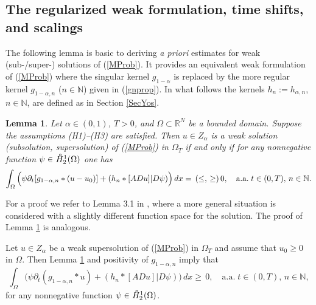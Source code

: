 \documentclass[10pt]{article}
\newtheorem{lemma}{Lemma}[section]
\newcommand{\iR}{\mathbb{R}}
\newcommand{\iN}{\mathbb{N}}
\newcommand{\oH}{\hspace*{0.39em}\raisebox{0.6ex}{\textdegree}\hspace{-0.72em}H}
\begin{document}
\subsection{The regularized weak formulation, time shifts, and
scalings}\label{SSS}
The following lemma is basic to deriving {\em a priori} estimates
for weak (sub-/super-) solutions of (\ref{MProb}). It provides an
equivalent weak formulation of (\ref{MProb}) where the singular
kernel $g_{1-\alpha}$ is replaced by the more regular kernel
$g_{1-\alpha,n}$ ($n\in\iN$) given in (\ref{gnprop}). In what
follows the kernels $h_n:=h_{\alpha,n}$, $n\in\iN$, are defined as
in Section \ref{SecYos}.
\begin{lemma} \label{LemmaReg}
Let $\alpha\in (0,1)$, $T>0$, and $\Omega\subset \iR^N$ be a bounded
domain. Suppose the assumptions (H1)--(H3) are satisfied. Then $u\in
Z_\alpha$ is a weak solution (subsolution, supersolution) of
(\ref{MProb}) in $\Omega_T$ if and only if for any nonnegative
function $\psi\in \oH^1_2(\Omega)$ one has
\begin{equation} \label{LemmaRegF}
\int_\Omega \Big(\psi \partial_t[g_{1-\alpha,n}\ast
(u-u_0)]+(h_n\ast [ADu]|D\psi)\Big)\,dx\nonumber\\
=\,(\le,\,\ge)\,0,\quad\mbox{a.a.}\;t\in (0,T),\,n\in \iN.
\end{equation}
\end{lemma}
For a proof we refer to Lemma 3.1 in \cite{Za2}, where a more
general situation is considered with a slightly different function
space for the solution. The proof of Lemma \ref{LemmaReg} is
analogous.

Let $u\in Z_\alpha$ be a weak supersolution of (\ref{MProb}) in
$\Omega_T$ and assume that $u_0\ge 0$ in $\Omega$. Then Lemma
\ref{LemmaReg} and positivity of $g_{1-\alpha,n}$ imply that
\begin{equation} \label{u0weg}
\int_\Omega \Big(\psi \partial_t(g_{1-\alpha,n}\ast u)+(h_n\ast
[ADu]|D\psi)\Big)\,dx \ge \,0,\quad\mbox{a.a.}\;t\in (0,T),\,n\in
\iN,
\end{equation}
for any nonnegative function $\psi\in \oH^1_2(\Omega)$.
\end{document}
